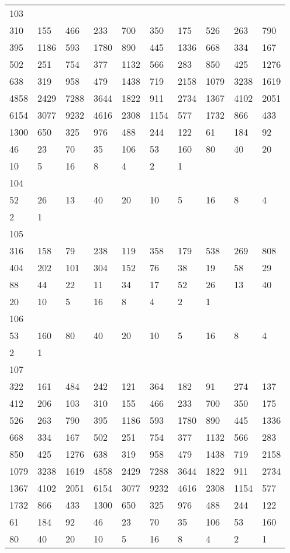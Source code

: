 \begin{longtable}{*{10}{l}}
103&&&&&&&&&\\
310& 155& 466& 233& 700& 350& 175& 526& 263& 790\\
395& 1186& 593& 1780& 890& 445& 1336& 668& 334& 167\\
502& 251& 754& 377& 1132& 566& 283& 850& 425& 1276\\
638& 319& 958& 479& 1438& 719& 2158& 1079& 3238& 1619\\
4858& 2429& 7288& 3644& 1822& 911& 2734& 1367& 4102& 2051\\
6154& 3077& 9232& 4616& 2308& 1154& 577& 1732& 866& 433\\
1300& 650& 325& 976& 488& 244& 122& 61& 184& 92\\
46& 23& 70& 35& 106& 53& 160& 80& 40& 20\\
10& 5& 16& 8& 4& 2& 1& \\

104&&&&&&&&&\\
52& 26& 13& 40& 20& 10& 5& 16& 8& 4\\
2& 1& \\

105&&&&&&&&&\\
316& 158& 79& 238& 119& 358& 179& 538& 269& 808\\
404& 202& 101& 304& 152& 76& 38& 19& 58& 29\\
88& 44& 22& 11& 34& 17& 52& 26& 13& 40\\
20& 10& 5& 16& 8& 4& 2& 1& \\

106&&&&&&&&&\\
53& 160& 80& 40& 20& 10& 5& 16& 8& 4\\
2& 1& \\

107&&&&&&&&&\\
322& 161& 484& 242& 121& 364& 182& 91& 274& 137\\
412& 206& 103& 310& 155& 466& 233& 700& 350& 175\\
526& 263& 790& 395& 1186& 593& 1780& 890& 445& 1336\\
668& 334& 167& 502& 251& 754& 377& 1132& 566& 283\\
850& 425& 1276& 638& 319& 958& 479& 1438& 719& 2158\\
1079& 3238& 1619& 4858& 2429& 7288& 3644& 1822& 911& 2734\\
1367& 4102& 2051& 6154& 3077& 9232& 4616& 2308& 1154& 577\\
1732& 866& 433& 1300& 650& 325& 976& 488& 244& 122\\
61& 184& 92& 46& 23& 70& 35& 106& 53& 160\\
80& 40& 20& 10& 5& 16& 8& 4& 2& 1\\


\end{longtable}
